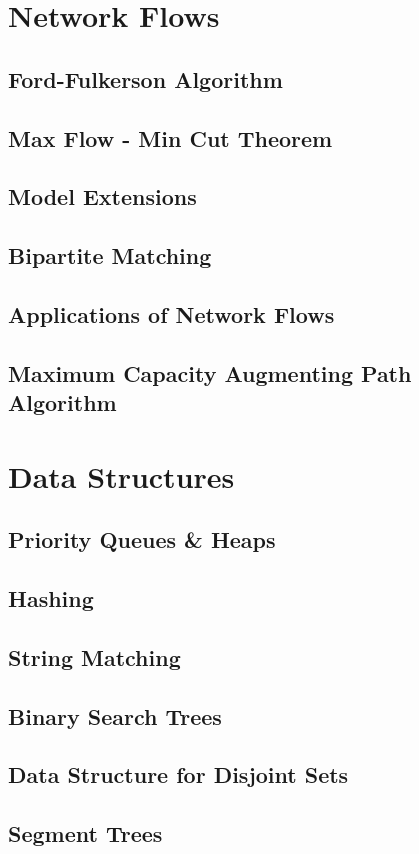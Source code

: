 \documentclass{article}
\begin{document}

\section{Network Flows}
\subsection{Ford-Fulkerson Algorithm}
\subsection{Max Flow - Min Cut Theorem}
\subsection{Model Extensions}
\subsection{Bipartite Matching}
\subsection{Applications of Network Flows}
\subsection{Maximum Capacity Augmenting Path Algorithm}
\newpage


\section{Data Structures}
\subsection{Priority Queues \& Heaps}
\subsection{Hashing}
\subsection{String Matching}
\subsection{Binary Search Trees}
\subsection{Data Structure for Disjoint Sets}
\subsection{Segment Trees}
\newpage

\end{document}
